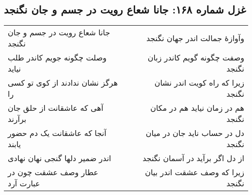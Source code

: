 \begin{center}
\section*{غزل شماره ۱۶۸: جانا شعاع رویت در جسم و جان نگنجد}
\label{sec:168}
\begin{longtable}{l p{0.5cm} r}
جانا شعاع رویت در جسم و جان نگنجد
&&
وآوازهٔ جمالت اندر جهان نگنجد
\\
وصلت چگونه جویم کاندر طلب نیاید
&&
وصفت چگونه گویم کاندر زبان نگنجد
\\
هرگز نشان ندادند از کوی تو کسی را
&&
زیرا که راه کویت اندر نشان نگنجد
\\
آهی که عاشقانت از حلق جان برآرند
&&
هم در زمان نیاید هم در مکان نگنجد
\\
آنجا که عاشقانت یک دم حضور یابند
&&
دل در حساب ناید جان در میان نگنجد
\\
اندر ضمیر دلها گنجی نهان نهادی
&&
از دل اگر برآید در آسمان نگنجد
\\
عطار وصف عشقت چون در عبارت آرد
&&
زیرا که وصف عشقت اندر بیان نگنجد
\\
\end{longtable}
\end{center}
